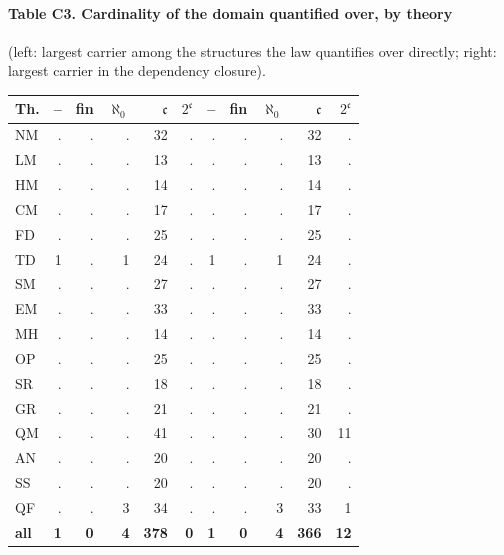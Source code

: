 \paragraph{Table C3. Cardinality of the domain quantified over, by theory} (left: largest carrier among the structures the law quantifies over directly; right: largest carrier in the dependency closure).
{\footnotesize\setlength{\tabcolsep}{3pt}
\begin{center}
\begin{tabular}{l r r r r r r r r r r }
\toprule
Th. & -- & fin & $\aleph_0$ & $\mathfrak c$ & $2^{\mathfrak c}$ & -- & fin & $\aleph_0$ & $\mathfrak c$ & $2^{\mathfrak c}$ \\
\midrule
NM & . & . & . & 32 & . & . & . & . & 32 & . \\
LM & . & . & . & 13 & . & . & . & . & 13 & . \\
HM & . & . & . & 14 & . & . & . & . & 14 & . \\
CM & . & . & . & 17 & . & . & . & . & 17 & . \\
FD & . & . & . & 25 & . & . & . & . & 25 & . \\
TD & 1 & . & 1 & 24 & . & 1 & . & 1 & 24 & . \\
SM & . & . & . & 27 & . & . & . & . & 27 & . \\
EM & . & . & . & 33 & . & . & . & . & 33 & . \\
MH & . & . & . & 14 & . & . & . & . & 14 & . \\
OP & . & . & . & 25 & . & . & . & . & 25 & . \\
SR & . & . & . & 18 & . & . & . & . & 18 & . \\
GR & . & . & . & 21 & . & . & . & . & 21 & . \\
QM & . & . & . & 41 & . & . & . & . & 30 & 11 \\
AN & . & . & . & 20 & . & . & . & . & 20 & . \\
SS & . & . & . & 20 & . & . & . & . & 20 & . \\
QF & . & . & 3 & 34 & . & . & . & 3 & 33 & 1 \\
\textbf{all} & \textbf{1} & \textbf{0} & \textbf{4} & \textbf{378} & \textbf{0} & \textbf{1} & \textbf{0} & \textbf{4} & \textbf{366} & \textbf{12} \\
\bottomrule
\end{tabular}
\end{center}
}
